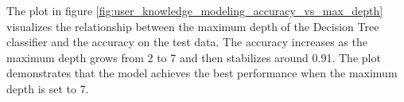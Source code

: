The plot in figure \ref{fig:user_knowledge_modeling_accuracy_vs_max_depth} visualizes the relationship between the maximum depth of the Decision Tree classifier and the accuracy on the test data. The accuracy increases as the maximum depth grows from 2 to 7 and then stabilizes around 0.91. The plot demonstrates that the model achieves the best performance when the maximum depth is set to 7.

